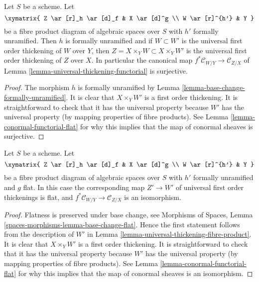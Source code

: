 \begin{lemma}
\label{lemma-universal-thickening-fibre-product}
Let $S$ be a scheme. Let
$$
\xymatrix{
Z \ar[r]_h \ar[d]_f & X \ar[d]^g \\
W \ar[r]^{h'} & Y
}
$$
be a fibre product diagram of algebraic spaces over $S$ with
$h'$ formally unramified. Then $h$ is formally unramified and if
$W \subset W'$ is the universal first order thickening of $W$ over $Y$,
then $Z = X \times_Y W \subset X \times_Y W'$ is the universal
first order thickening of $Z$ over $X$. In particular the canonical map
$f^*\mathcal{C}_{W/Y} \to \mathcal{C}_{Z/X}$ of
Lemma \ref{lemma-universal-thickening-functorial}
is surjective.
\end{lemma}

\begin{proof}
The morphism $h$ is formally unramified by
Lemma \ref{lemma-base-change-formally-unramified}.
It is clear that $X \times_Y W'$ is a first order thickening.
It is straightforward to check that it has the universal property
because $W'$ has the universal property (by mapping properties of
fibre products). See
Lemma \ref{lemma-conormal-functorial-flat}
for why this implies that the map of conormal sheaves is surjective.
\end{proof}

\begin{lemma}
\label{lemma-universal-thickening-fibre-product-flat}
Let $S$ be a scheme. Let
$$
\xymatrix{
Z \ar[r]_h \ar[d]_f & X \ar[d]^g \\
W \ar[r]^{h'} & Y
}
$$
be a fibre product diagram of algebraic spaces over $S$ with
$h'$ formally unramified and $g$ flat. In this case the corresponding
map $Z' \to W'$ of universal first order thickenings is flat, and
$f^*\mathcal{C}_{W/Y} \to \mathcal{C}_{Z/X}$ is an isomorphism.
\end{lemma}

\begin{proof}
Flatness is preserved under base change, see
Morphisms of Spaces, Lemma \ref{spaces-morphisms-lemma-base-change-flat}.
Hence the first statement follows from the description of $W'$ in
Lemma \ref{lemma-universal-thickening-fibre-product}.
It is clear that $X \times_Y W'$ is a first order thickening.
It is straightforward to check that it has the universal property
because $W'$ has the universal property (by mapping properties of
fibre products). See
Lemma \ref{lemma-conormal-functorial-flat}
for why this implies that the map of conormal sheaves is an isomorphism.
\end{proof}

